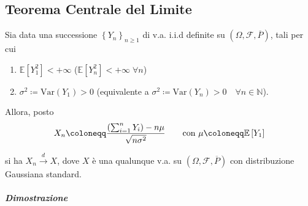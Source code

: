 \documentclass[a4paper,10pt]{article}
\theoremstyle{remark}
\theoremstyle{definition}
\begin{document}
\subsection*{Teorema Centrale del Limite}

Sia data una successione $\left\{ Y_{n}\right\} _{n\geq1}$ di v.a.
i.i.d definite su $\left(\Omega,\mathscr{F},\overline{P}\right)$,
tali per cui
\begin{enumerate}
\item $\mathbb{E}\left[Y_{1}^{2}\right]<+\infty$ ($\mathbb{E}\left[Y_{n}^{2}\right]<+\infty\;\forall n$)
\item $\sigma^{2}\coloneqq\text{Var}\left(Y_{1}\right)>0$ (equivalente
a $\sigma^{2}\coloneqq\text{Var}\left(Y_{n}\right)>0\quad\forall n\in\mathbb{N}$).
\end{enumerate}
Allora, posto
\[
X_{n}\coloneqq\frac{\left(\sum_{i=1}^{n}Y_{i}\right)-n\mu}{\sqrt{n\sigma^{2}}}\qquad\text{con \ensuremath{\mu\coloneqq\mathbb{E}\left[Y_{1}\right]}}
\]

si ha $X_{n}\overset{d}{\longrightarrow}X$, dove $X$ è una qualunque
v.a. su $\left(\Omega,\mathscr{F},\overline{P}\right)$ con distribuzione
Gaussiana standard.

\subparagraph*{Dimostrazione}
\end{document}
